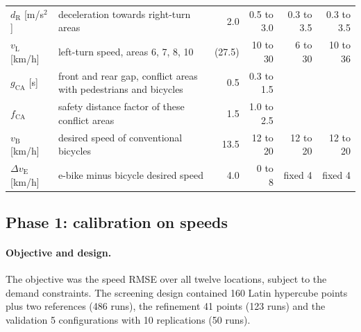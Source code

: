 \documentclass[11pt,a4paper]{article}
\begin{document}
\begin{table}[!htb]
\begin{tabularx}{\textwidth}{lXrrrr}
$d_{\mathrm{R}}$ [m/s$^2$] & deceleration towards right-turn areas & 2.0 & 0.5 to 3.0 & 0.3 to 3.5 & 0.3 to 3.5\\
$v_{\mathrm{L}}$ [km/h] & left-turn speed, areas 6, 7, 8, 10 & (27.5) & 10 to 30 & 6 to 30 & 10 to 36\\
$g_{\mathrm{CA}}$ [s] & front and rear gap, conflict areas with pedestrians and bicycles & 0.5 & 0.3 to 1.5 & & \\
$f_{\mathrm{CA}}$ & safety distance factor of these conflict areas & 1.5 & 1.0 to 2.5 & & \\
$v_{\mathrm{B}}$ [km/h] & desired speed of conventional bicycles & 13.5 & 12 to 20 & 12 to 20 & 12 to 20\\
$\Delta v_{\mathrm{E}}$ [km/h] & e-bike minus bicycle desired speed & 4.0 & 0 to 8 & fixed 4 & fixed 4\\
\bottomrule
\end{tabularx}
\end{table}

\subsection{Phase 1: calibration on speeds}
\label{sec:phase1}

\paragraph{Objective and design.} The objective was the speed RMSE over all twelve locations,
subject to the demand constraints. The screening design contained 160 Latin hypercube points plus
two references (486 runs), the refinement 41 points (123 runs) and the validation 5 configurations
with 10 replications (50 runs).
\end{document}
